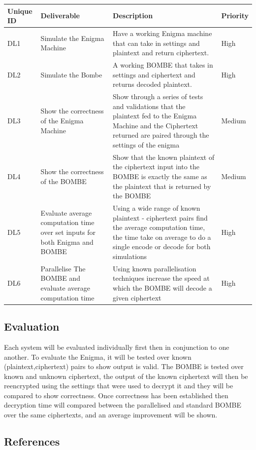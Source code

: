 \documentclass[12pt,a4paper]{article}
\begin{document}
\vspace*{6pt}
\label{units}
\begin{longtable}{ |p{1.25cm}|p{4cm}|p{5cm}|p{2cm}| }\hline\hline
Unique ID & Deliverable & Description & Priority \\ \hline
DL1 & Simulate the Enigma Machine & Have a working Enigma machine that can take in settings and plaintext and return ciphertext. & High \\ \hline
DL2 & Simulate the Bombe & A working BOMBE that takes in settings and ciphertext and returns decoded plaintext. & High \\ \hline
DL3 & Show the correctness of the Enigma Machine & Show through a series of tests and validations that the plaintext fed to the Enigma Machine and the Ciphertext returned are paired through the settings of the enigma & Medium \\ \hline
DL4 & Show the correctness of the BOMBE & Show that the known plaintext of the ciphertext input into the BOMBE is exactly the same as the plaintext that is returned by the BOMBE & Medium \\ \hline
DL5 & Evaluate average computation time over set inputs for both Enigma and BOMBE & Using a wide range of known plaintext - ciphertext pairs find the average computation time, the time take on average to do a single encode or decode for both simulations & High \\ \hline
DL6 & Parallelise The BOMBE and evaluate average computation time & Using known parallelisation techniques increase the speed at which the BOMBE will decode a given ciphertext & High \\ \hline
\end{longtable}

\subsection{Evaluation}

Each system will be evaluated individually first then in conjunction to one another. To evaluate the Enigma, it will be tested over known (plaintext,ciphertext) pairs to show output is valid. The BOMBE is tested over known and unknown ciphertext, the output of the known ciphertext will then be reencrypted using the settings that were used to decrypt it and they will be compared to show correctness. Once correctness has been established then decryption time will compared between the parallelised and standard BOMBE over the same ciphertexts, and an average improvement will be shown.

\subsection{References} 



\nocite{*}
\end{document}
